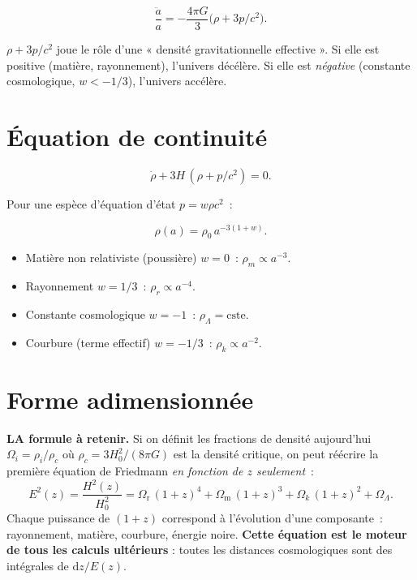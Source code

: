 \documentclass[11pt,a4paper,openany]{report}
\newcommand{\dif}{\mathrm{d}}
\newcommand{\Hzero}{H_{0}}
\newcommand{\Om}{\Omega_{\mathrm{m}}}
\newcommand{\Or}{\Omega_{\mathrm{r}}}
\newcommand{\OL}{\Omega_{\Lambda}}
\newcommand{\Ok}{\Omega_{k}}
\begin{document}
\begin{equation}
\boxed{\;\frac{\ddot a}{a} = -\frac{4\pi G}{3}\bigl(\rho + 3p/c^{2}\bigr).\;}
\label{eq:F2}
\end{equation}

\begin{tcolorbox}[vulgarisation]
$\rho + 3p/c^{2}$ joue le rôle d'une « densité gravitationnelle effective ».
Si elle est positive (matière, rayonnement), l'univers décélère. Si elle est
\emph{négative} (constante cosmologique, $w<-1/3$), l'univers accélère.
\end{tcolorbox}

\section{Équation de continuité}

\begin{equation}
\boxed{\;\dot\rho + 3H\,(\rho + p/c^{2}) = 0.\;}
\label{eq:continuity}
\end{equation}

Pour une espèce d'équation d'état $p = w\rho c^{2}$~:

\begin{equation}
\rho(a) = \rho_{0}\,a^{-3(1+w)}.
\label{eq:rho_evol}
\end{equation}

\begin{itemize}[topsep=2pt]
  \item Matière non relativiste (poussière) $w=0$~: $\rho_m \propto a^{-3}$.
  \item Rayonnement $w=1/3$~: $\rho_r \propto a^{-4}$.
  \item Constante cosmologique $w=-1$~: $\rho_{\Lambda} = \text{cste}$.
  \item Courbure (terme effectif) $w=-1/3$~: $\rho_k \propto a^{-2}$.
\end{itemize}

\section{Forme adimensionnée}

\begin{tcolorbox}[mathspe]
\textbf{LA formule à retenir.} Si on définit les fractions de densité
aujourd'hui $\Omega_i = \rho_i/\rho_c$ où $\rho_c = 3\Hzero^{2}/(8\pi G)$ est
la densité critique, on peut réécrire la première équation de Friedmann
\emph{en fonction de $z$ seulement}~:
\[
\boxed{\;
E^{2}(z) = \frac{H^{2}(z)}{\Hzero^{2}}
        = \Or\,(1+z)^{4} + \Om\,(1+z)^{3} + \Ok\,(1+z)^{2} + \OL.\;
}
\]
Chaque puissance de $(1+z)$ correspond à l'évolution d'une composante~:
rayonnement, matière, courbure, énergie noire. \textbf{Cette équation est le
moteur de tous les calculs ultérieurs} : toutes les distances cosmologiques
sont des intégrales de $\dif z / E(z)$.
\end{tcolorbox}
\end{document}
